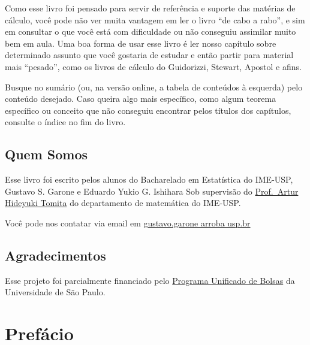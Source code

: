 \documentclass[
  letterpaper,
  DIV=11,
  numbers=noendperiod]{scrreprt}
\begin{document}

Como esse livro foi pensado para servir de referência e suporte das
matérias de cálculo, você pode não ver muita vantagem em ler o livro
``de cabo a rabo'', e sim em consultar o que você está com dificuldade
ou não conseguiu assimilar muito bem em aula. Uma boa forma de usar esse
livro é ler nosso capítulo sobre determinado assunto que você gostaria
de estudar e então partir para material mais ``pesado'', como os livros
de cálculo do Guidorizzi, Stewart, Apostol e afins.

Busque no sumário (ou, na versão online, a tabela de conteúdos à
esquerda) pelo conteúdo desejado. Caso queira algo mais específico, como
algum teorema específico ou conceito que não conseguiu encontrar pelos
títulos dos capítulos, consulte o índice no fim do livro.

\section*{Quem Somos}\label{quem-somos}


Esse livro foi escrito pelos alunos do Bacharelado em Estatística do
IME-USP, Gustavo S. Garone e Eduardo Yukio G. Ishihara Sob supervisão do
\href{https://www.ime.usp.br/~tomita/}{Prof.~Artur Hideyuki Tomita} do
departamento de matemática do IME-USP.

Você pode nos contatar via email em
\href{mailto:gustavo.garone@usp.br}{gustavo.garone arroba usp.br}

\section*{Agradecimentos}\label{agradecimentos}


Esse projeto foi parcialmente financiado pelo
\href{https://prip.usp.br/pub/}{Programa Unificado de Bolsas} da
Universidade de São Paulo.


\chapter*{Prefácio}\label{prefuxe1cio}

\end{document}
